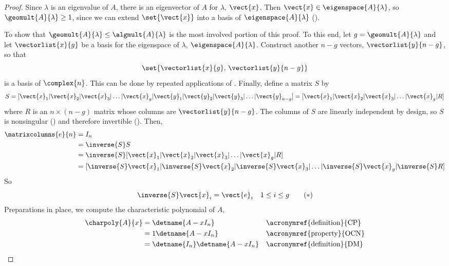 %
\begin{proof}
Since $\lambda$ is an eigenvalue of $A$, there is an eigenvector of $A$ for $\lambda$, $\vect{x}$.  Then $\vect{x}\in\eigenspace{A}{\lambda}$, so $\geomult{A}{\lambda}\geq 1$, since we can extend $\set{\vect{x}}$ into a basis of $\eigenspace{A}{\lambda}$ ().\par
%
To show that $\geomult{A}{\lambda}\leq\algmult{A}{\lambda}$ is the most involved portion of this proof.  To this end, let $g=\geomult{A}{\lambda}$ and let $\vectorlist{x}{g}$ be a basis for the eigenspace of $\lambda$, $\eigenspace{A}{\lambda}$.  Construct another $n-g$ vectors, $\vectorlist{y}{n-g}$, so that 
%
\begin{equation*}
\set{\vectorlist{x}{g},\,\vectorlist{y}{n-g}}
\end{equation*}
%
is a basis of $\complex{n}$.  This can be done by repeated applications of .  Finally, define a matrix $S$ by
%
\begin{equation*}
S=[\vect{x}_1|\vect{x}_2|\vect{x}_3|\ldots|\vect{x}_g|\vect{y}_1|\vect{y}_2|\vect{y}_3|\ldots|\vect{y}_{n-g}]
=[\vect{x}_1|\vect{x}_2|\vect{x}_3|\ldots|\vect{x}_g|R]
\end{equation*}
%
where $R$ is an $n\times(n-g)$ matrix whose columns are $\vectorlist{y}{n-g}$.  The columns of $S$ are linearly independent by design, so $S$ is nonsingular () and therefore invertible ().  Then,
%
\begin{align*}
\matrixcolumns{e}{n}&=I_n\\
&=\inverse{S}S\\
&=\inverse{S}[\vect{x}_1|\vect{x}_2|\vect{x}_3|\ldots|\vect{x}_g|R]\\
&=[\inverse{S}\vect{x}_1|\inverse{S}\vect{x}_2|\inverse{S}\vect{x}_3|\ldots|\inverse{S}\vect{x}_g|\inverse{S}R]
\end{align*}
%
So
%
\begin{equation*}
\inverse{S}\vect{x}_i=\vect{e}_i\quad 1\leq i\leq g\tag{$*$}
\end{equation*}
%
Preparations in place, we compute the characteristic polynomial of $A$,
%
\begin{align*}
\charpoly{A}{x}&=\detname{A-xI_n}&&\text{\acronymref{definition}{CP}}\\
&=1\detname{A-xI_n}&&\text{\acronymref{property}{OCN}}\\
&=\detname{I_n}\detname{A-xI_n}&&\text{\acronymref{definition}{DM}}\\

\end{align*}
\end{proof}
